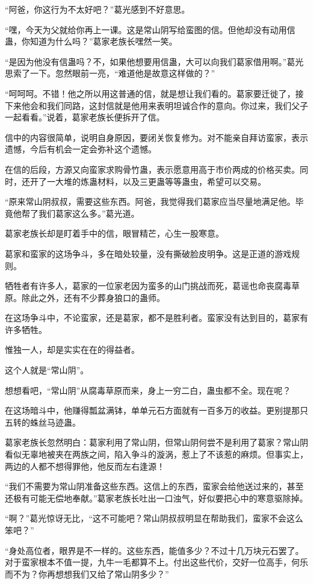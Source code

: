 \begin{this_body}
“阿爸，你这行为不太好吧？”葛光感到不好意思。

“嘿，今天为父就给你再上一课。这是常山阴写给蛮图的信。但他却没有动用信蛊，你知道为什么吗？”葛家老族长嘿然一笑。

“是因为他没有信蛊吗？不，如果他想要用信蛊，大可以向我们葛家借用啊。”葛光思索了一下。忽然眼前一亮，“难道他是故意这样做的？”

“呵呵呵。不错！他之所以用这普通的信，就是想让我们看的。葛家要迁徙了，接下来他会和我们同路，这封信就是他用来表明坦诚合作的意向。你过来，我们父子一起看看。”说着，葛家老族长便拆开了信。

信中的内容很简单，说明自身原因，要闭关恢复修为。对不能亲自拜访蛮家，表示遗憾，今后有机会一定会弥补这个遗憾。

在信的后段，方源又向蛮家求购骨竹蛊，表示愿意用高于市价两成的价格买卖。同时，还开了一大堆的炼蛊材料，以及三更蛊等等蛊虫，希望可以交易。

“原来常山阴叔叔，需要这些东西。阿爸，我觉得我们葛家应当尽量地满足他。毕竟他帮了我们葛家这么多。”葛光道。

葛家老族长却是盯着手中的信，眼冒精芒，心生一股寒意。

葛家和蛮家的这场争斗，多在暗处较量，没有撕破脸皮明争。这是正道的游戏规则。

牺牲者有许多人，葛家的一位家老因为蛮多的山门挑战而死，葛谣也命丧腐毒草原。除此之外，还有不少葬身狼口的蛊师。

在这场争斗中，不论蛮家，还是葛家，都不是胜利者。蛮家没有达到目的，葛家有许多牺牲。

惟独一人，却是实实在在的得益者。

这个人就是“常山阴”。

想想看吧，“常山阴”从腐毒草原而来，身上一穷二白，蛊虫都不全。现在呢？

在这场暗斗中，他赚得瓢盆满钵，单单元石方面就有一百多万的收益。更别提那只五转的蛛丝马迹蛊。

葛家老族长忽然明白：葛家利用了常山阴，但常山阴何尝不是利用了葛家？常山阴看似无辜地被夹在两族之间，陷入争斗的漩涡，惹上了不该惹的麻烦。但事实上，两边的人都不想得罪他，他反而左右逢源！

“我们不需要为常山阴准备这些东西。这信上的东西，蛮家会给他送过来的，甚至还极有可能无偿地奉献。”葛家老族长吐出一口浊气，好似要把心中的寒意驱除掉。

“啊？”葛光惊讶无比，“这不可能吧？常山阴叔叔明显在帮助我们，蛮家不会这么笨吧？”

“身处高位者，眼界是不一样的。这些东西，能值多少？不过十几万块元石罢了。对于蛮家根本不值一提，九牛一毛都算不上。付出这些代价，交好一位高手，何乐而不为？你再想想我们又给了常山阴多少？”


\end{this_body}
